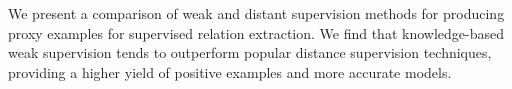 We present a comparison of weak and distant supervision methods for producing proxy examples for supervised relation extraction.  We find that knowledge-based weak supervision tends to outperform popular distance supervision techniques, providing a higher yield of positive examples and more accurate models.
